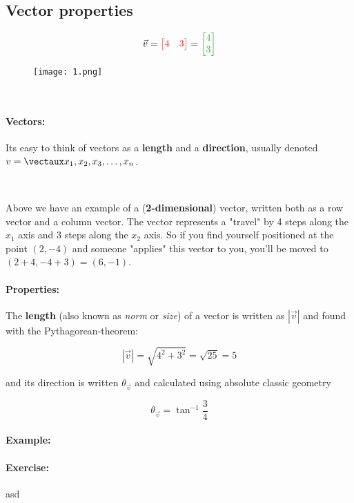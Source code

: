 \documentclass{article}
\begin{document}
\color{white}\subsection{Vector properties}\color{black}


\begin{minipage}{0.1\textwidth}
\quad
\end{minipage}
\begin{minipage}{0.25\textwidth}
\begin{align*}
\vec{v}  = \color{rooj} \begin{bmatrix} 4 & 3 \end{bmatrix}  \color{black}
 =  \color{groen} \begin{bmatrix} 4 \\ 3 \end{bmatrix}  \color{black}
\end{align*}
\end{minipage} \hfill
\begin{minipage}{0.4\textwidth}
\begin{figure}[H]
\texttt{[image: 1.png]}
\end{figure}
\end{minipage}
\begin{minipage}{0.1\textwidth}
\quad
\end{minipage}

\

\paragraph{Vectors: } Its easy to think of vectors as a \textbf{length} and a \textbf{direction}, usually denoted $v = \vect{x_1,  x_2,  x_3, \dots, x_n}$.

\

Above we have an example of  a (\textbf{2-dimensional}) vector, written both as a \color{rooj} row vector \color{black} and a \color{groen} column vector\color{black}. The vector represents a "travel" by 4 steps along the $x_1$ axis and 3 steps along the $x_2$ axis. So if you find yourself positioned at the point $(2,-4)$ and someone "applies" this vector to you, you'll be moved to $(2+4, -4+3) = (6,-1)$.

\paragraph{Properties: }


The \textbf{length} (also known as \textit{norm} or \textit{size}) of a vector is written as $|\vec{v}|$ and found with the Pythagorean-theorem:

\[
|\vec{v}| = \sqrt{4^2 + 3^2} = \sqrt{25} = 5
\]




and its direction is written $\theta_{\vec{v}}$ and calculated using absolute classic geometry

\[
\theta_{\vec{v}} = \tan^{-1}\frac{3}{4} 
\]


\paragraph{Example: }

\paragraph{Exercise: } asd
\end{document}
